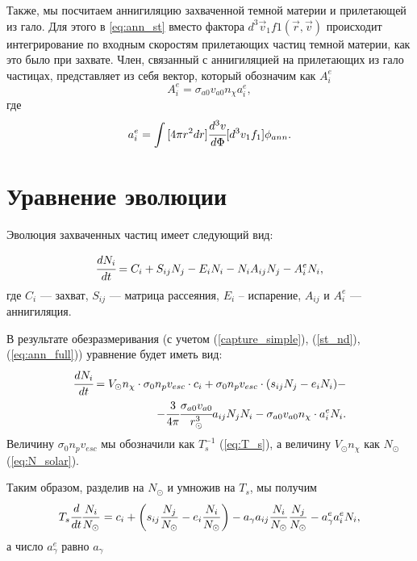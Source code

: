 Также, мы посчитаем аннигиляцию захваченной темной материи и прилетающей из гало. Для этого в \ref{eq:ann_st} вместо фактора $d^3\vec{v}_1f1(\vec{r},\vec{v})$ происходит интегрирование по входным скоростям прилетающих частиц темной материи, как это было при захвате. Член, связанный с аннигиляцией на прилетающих из гало частицах, представляет из себя вектор, который обозначим как $A^e_i$
\begin{equation}
	\label{eq:ANN_full}
	A^e_{i} = \sigma_{a0} v_{a0} n_{\chi} a^e_{i},
\end{equation}
где
\begin{equation}
	\label{eq:ann_full}
	a^e_{i} = \int{[4\pi r^2dr] \cfrac{d^3v}{d\Phi}} [d^3v_1f_1] \phi_{ann}.
\end{equation} 

\section{Уравнение эволюции}

Эволюция захваченных частиц имеет следующий вид:

\begin{equation}
	\cfrac{d N_i}{d t} = C_i + S_{ij}N_j - E_i N_i - N_i A_{ij} N_j - A^e_{i}N_i,
\end{equation}
где $C_i$ --- захват,  $S_{ij}$ --- матрица рассеяния, $E_i$ -- испарение, $A_{ij}$ и $A^e_{i}$ --- аннигиляция.

В результате обезразмеривания (с учетом (\ref{capture_simple}), (\ref{st_nd}), (\ref{eq:ann_full})) уравнение будет иметь вид:
\begin{equation*}
\begin{split}
	\cfrac{d N_i}{d t} = V_{\odot}n_{\chi} \cdot \sigma_{0} n_p v_{esc} \cdot c_{i} + \sigma_{0} n_p v_{esc} \cdot (s_{ij}N_j - e_i N_i) -\\
	-\cfrac{3}{4\pi}\cfrac{\sigma_{a0} v_{a0}}{r_{\odot}^3} a_{ij} N_j N_i-
	\sigma_{a0} v_{a0} n_{\chi} \cdot a^e_i N_i.
\end{split}
\end{equation*}
Величину $\sigma_{0} n_p v_{esc}$ мы обозначили как $T_s^{-1}$ (\ref{eq:T_s}), а величину $V_{\odot}n_{\chi}$ как $N_{\odot}$ (\ref{eq:N_solar}).

Таким образом, разделив на $N_{\odot}$ и умножив на $T_s$, мы получим
\begin{equation}
	\label{eq:evol_compt}
	T_s\cfrac{d }{d t}\frac{N_i}{N_{\odot}} = c_{i} + \left(s_{ij} \frac{N_j}{N_{\odot}} - e_i \frac{N_i}{N_{\odot}}\right) - a_{\gamma} a_{ij} \frac{N_i}{N_{\odot}} \frac{N_j}{N_{\odot}} -  a^e_{\gamma} a^e_i N_i,
\end{equation}
а число $a^e_{\gamma}$ равно $a_{\gamma}$


